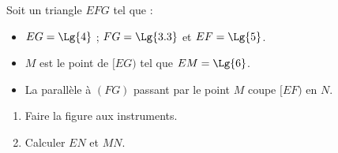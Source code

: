\begin{exercice*}    
    Soit un triangle $EFG$ tel que :
        \begin{itemize}
            \item $EG=\Lg{4}$ ; $FG=\Lg{3.3}$ et $EF=\Lg{5}$.
            \item $M$ est le point de $[EG)$ tel que $EM=\Lg{6}$.
            \item La parallèle à $(FG)$ passant par le point $M$ coupe $[EF)$ en $N$.
        \end{itemize}
        \begin{enumerate}
            \item Faire la figure aux instruments.
            \item Calculer $EN$ et $MN$.
        \end{enumerate}
\end{exercice*}
